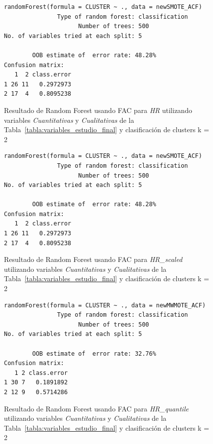 \begin{figure}[H]
    \centering
    \begin{lstlisting}[frame=single, basicstyle=\small\ttfamily]
        randomForest(formula = CLUSTER ~ ., data = newSMOTE_ACF) 
               Type of random forest: classification
                     Number of trees: 500
No. of variables tried at each split: 5

        OOB estimate of  error rate: 48.28%
Confusion matrix:
   1  2 class.error
1 26 11   0.2972973
2 17  4   0.8095238
    \end{lstlisting}
    \caption{Resultado de Random Forest usando FAC para \textit{HR} utilizando variables \textit{Cuantitativas} y \textit{Cualitativas} de la Tabla~\ref{tabla:variables_estudio_final} y clasificación de clusters k = 2}\label{fig:random_forest_acf_result_1}
\end{figure}
\begin{figure}[H]
    \centering
    \begin{lstlisting}[frame=single, basicstyle=\small\ttfamily]
        randomForest(formula = CLUSTER ~ ., data = newSMOTE_ACF) 
               Type of random forest: classification
                     Number of trees: 500
No. of variables tried at each split: 5

        OOB estimate of  error rate: 48.28%
Confusion matrix:
   1  2 class.error
1 26 11   0.2972973
2 17  4   0.8095238
    \end{lstlisting}
    \caption{Resultado de Random Forest usando FAC para \textit{HR\_scaled} utilizando variables \textit{Cuantitativas} y \textit{Cualitativas} de la Tabla~\ref{tabla:variables_estudio_final} y clasificación de clusters k = 2}
    \label{fig:random_forest_acf_result_2}
\end{figure}

\begin{figure}[H]
    \centering
    \begin{lstlisting}[frame=single, basicstyle=\small\ttfamily]
        randomForest(formula = CLUSTER ~ ., data = newMWMOTE_ACF) 
               Type of random forest: classification
                     Number of trees: 500
No. of variables tried at each split: 5

        OOB estimate of  error rate: 32.76%
Confusion matrix:
   1 2 class.error
1 30 7   0.1891892
2 12 9   0.5714286
    \end{lstlisting}
    \caption{Resultado de Random Forest usando FAC para \textit{HR\_quantile} utilizando variables \textit{Cuantitativas} y \textit{Cualitativas} de la Tabla~\ref{tabla:variables_estudio_final} y clasificación de clusters k = 2}
    \label{fig:random_forest_acf_result_3}
\end{figure}


